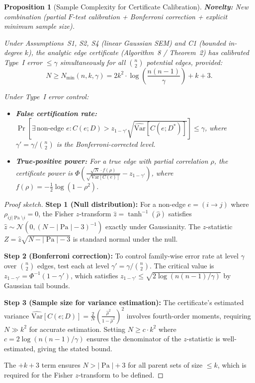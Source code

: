 \documentclass{article}
\theoremstyle{definition}
\theoremstyle{plain}
\newtheorem{proposition}{Proposition}
\theoremstyle{remark}
\DeclareMathOperator{\Pa}{Pa}
\begin{document}
\begin{proposition}[Sample Complexity for Certificate Calibration]
\label{prop:certificate_calibration}
\textbf{Novelty:} New combination (partial $F$-test calibration + Bonferroni correction + explicit minimum sample size).

Under Assumptions~S1, S2, S4 (linear Gaussian SEM) and C1 (bounded in-degree $k$),
the analytic edge certificate (Algorithm~8 / Theorem~2) has calibrated Type~I error
$\leq \gamma$ simultaneously for all $\binom{n}{2}$ potential edges, provided:
\begin{equation}
N \geq N_{\min}(n, k, \gamma) = 2 k^2 \cdot \log\!\left(\frac{n(n-1)}{\gamma}\right) + k + 3.
\end{equation}

Under Type~I error control:
\begin{itemize}
  \item \textbf{False certification rate:} $\Pr[\exists\, \text{non-edge } e: C(e; D) > z_{1-\gamma'}\sqrt{\widehat{\mathrm{Var}}[C(e; D^*)]}] \leq \gamma$,
    where $\gamma' = \gamma / \binom{n}{2}$ is the Bonferroni-corrected level.
  \item \textbf{True-positive power:} For a true edge with partial correlation $\rho$,
    the certificate power is $\Phi\!\left(\frac{\sqrt{N} \cdot f(\rho)}{\sqrt{\mathrm{Var}[C(e)]}} - z_{1-\gamma'}\right)$,
    where $f(\rho) = -\frac{1}{2}\log(1 - \rho^2)$.
\end{itemize}
\end{proposition}

\begin{proof}[Proof sketch]
\textbf{Step 1 (Null distribution):} For a non-edge $e = (i \to j)$ where
$\rho_{ij|\Pa\setminus i} = 0$, the Fisher $z$-transform $\hat{z} = \tanh^{-1}(\hat{\rho})$
satisfies $\hat{z} \sim \mathcal{N}(0, (N - |\Pa| - 3)^{-1})$ exactly under Gaussianity.
The $z$-statistic $Z = \hat{z}\sqrt{N - |\Pa| - 3}$ is standard normal under the null.

\textbf{Step 2 (Bonferroni correction):} To control family-wise error rate at
level $\gamma$ over $\binom{n}{2}$ edges, test each at level $\gamma' = \gamma / \binom{n}{2}$.
The critical value is $z_{1-\gamma'} = \Phi^{-1}(1 - \gamma')$, which satisfies
$z_{1-\gamma'} \leq \sqrt{2\log(n(n-1)/\gamma)}$ by Gaussian tail bounds.

\textbf{Step 3 (Sample size for variance estimation):} The certificate's estimated
variance $\widehat{\mathrm{Var}}[C(e; D)] = \frac{2}{N}\left(\frac{\hat{\rho}^2}{1 - \hat{\rho}^2}\right)^2$
involves fourth-order moments, requiring $N \gg k^2$ for accurate estimation. Setting
$N \geq c \cdot k^2$ where $c = 2\log(n(n-1)/\gamma)$ ensures the denominator of
the $z$-statistic is well-estimated, giving the stated bound.

The $+ k + 3$ term ensures $N > |\Pa| + 3$ for all parent sets of size $\leq k$,
which is required for the Fisher $z$-transform to be defined.
\end{proof}
\end{document}
